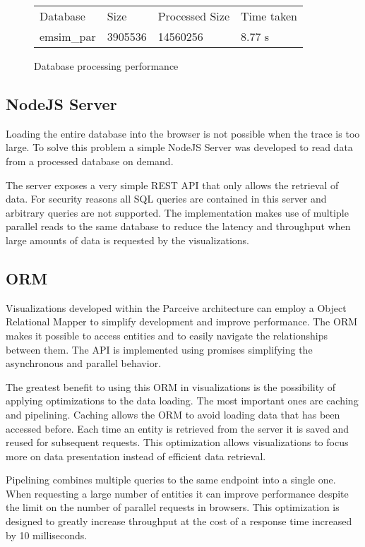 \begin{figure}
	\centering
	\begin{tabular}{l l l l}
		Database & Size & Processed Size & Time taken \\
		emsim\_par & 3905536 & 14560256 & 8.77 s
	\end{tabular}
	\caption{Database processing performance}
	\label{parceive:procperformance}
\end{figure}

\subsection{NodeJS Server}
Loading the entire database into the browser is not possible when the trace is
too large. To solve this problem a simple NodeJS Server was developed to read
data from a processed database on demand.

The server exposes a very simple REST \cite{rest} API that only allows the
retrieval of data. For security reasons all SQL queries are contained in this
server and arbitrary queries are not supported. The implementation makes use
of multiple parallel reads to the same database to reduce the latency and
throughput when large amounts of data is requested by the visualizations.

\subsection{ORM}

Visualizations developed within the Parceive architecture can employ a Object
Relational Mapper to simplify development and improve performance. The ORM
makes it possible to access entities and to easily navigate the relationships
between them. The API is implemented using promises \cite{promises} simplifying
the asynchronous and parallel behavior. 

The greatest benefit to using this ORM in visualizations is the possibility of
applying optimizations to the data loading. The most important ones are caching
and pipelining. Caching allows the ORM to avoid loading data that has been
accessed before. Each time an entity is retrieved from the server it is saved
and reused for subsequent requests. This optimization allows visualizations to
focus more on data presentation instead of efficient data retrieval.

Pipelining combines multiple queries to the same endpoint into a single one.
When requesting a large number of entities it can improve performance despite
the limit on the number of parallel requests in browsers. This optimization is
designed to greatly increase throughput at the cost of a response time
increased by 10 milliseconds.

